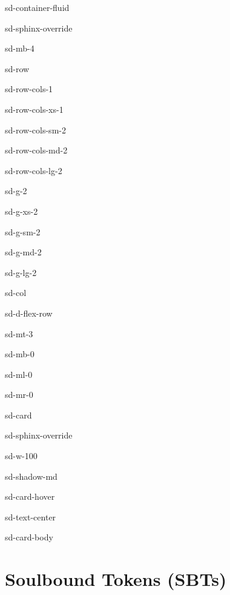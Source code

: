 \documentclass[letterpaper,10pt,english]{jupyterBook}
\begin{document}
\begin{sphinxuseclass}{sd-container-fluid}
\begin{sphinxuseclass}{sd-sphinx-override}
\begin{sphinxuseclass}{sd-mb-4}
\begin{sphinxuseclass}{sd-row}
\begin{sphinxuseclass}{sd-row-cols-1}
\begin{sphinxuseclass}{sd-row-cols-xs-1}
\begin{sphinxuseclass}{sd-row-cols-sm-2}
\begin{sphinxuseclass}{sd-row-cols-md-2}
\begin{sphinxuseclass}{sd-row-cols-lg-2}
\begin{sphinxuseclass}{sd-g-2}
\begin{sphinxuseclass}{sd-g-xs-2}
\begin{sphinxuseclass}{sd-g-sm-2}
\begin{sphinxuseclass}{sd-g-md-2}
\begin{sphinxuseclass}{sd-g-lg-2}
\begin{sphinxuseclass}{sd-col}
\begin{sphinxuseclass}{sd-d-flex-row}
\begin{sphinxuseclass}{sd-mt-3}
\begin{sphinxuseclass}{sd-mb-0}
\begin{sphinxuseclass}{sd-ml-0}
\begin{sphinxuseclass}{sd-mr-0}
\begin{sphinxuseclass}{sd-card}
\begin{sphinxuseclass}{sd-sphinx-override}
\begin{sphinxuseclass}{sd-w-100}
\begin{sphinxuseclass}{sd-shadow-md}
\begin{sphinxuseclass}{sd-card-hover}
\begin{sphinxuseclass}{sd-text-center}
\begin{sphinxuseclass}{sd-card-body}
\end{sphinxuseclass}
\end{sphinxuseclass}
\end{sphinxuseclass}
\end{sphinxuseclass}
\end{sphinxuseclass}
\end{sphinxuseclass}
\end{sphinxuseclass}
\end{sphinxuseclass}
\end{sphinxuseclass}
\end{sphinxuseclass}
\end{sphinxuseclass}
\end{sphinxuseclass}
\end{sphinxuseclass}
\end{sphinxuseclass}
\end{sphinxuseclass}
\end{sphinxuseclass}
\end{sphinxuseclass}
\end{sphinxuseclass}
\end{sphinxuseclass}
\end{sphinxuseclass}
\end{sphinxuseclass}
\end{sphinxuseclass}
\end{sphinxuseclass}
\end{sphinxuseclass}
\end{sphinxuseclass}
\end{sphinxuseclass}
\end{sphinxuseclass}
\sphinxstepscope


\section{Soulbound Tokens (SBTs)}
\label{\detokenize{SBT/SBT:soulbound-tokens-sbts}}\label{\detokenize{SBT/SBT::doc}}
\sphinxAtStartPar
{}
\end{document}
